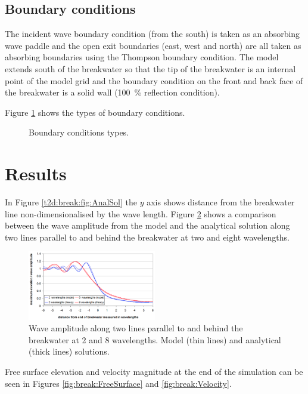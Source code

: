 \subsection{Boundary conditions}
The incident wave boundary condition (from the south) is taken as an absorbing
wave paddle and the open exit boundaries (east, west and north) are all taken
as absorbing boundaries using the Thompson boundary condition.
The model extends south of the breakwater so that the tip of the breakwater is
an internal point of the model grid and the boundary condition on the front and
back face of the breakwater is a solid wall (100~\% reflection condition).

Figure \ref{t2d:break:fig:BC} shows the types of boundary conditions.
\begin{figure}[!htbp]
 \centering
 \caption{Boundary conditions types.}
 \label{t2d:break:fig:BC}
\end{figure}

\section{Results}
In Figure \ref{t2d:break:fig:AnalSol} the $y$ axis shows distance from the
breakwater line non-dimensionalised by the wave length.
Figure \ref{t2d:break:fig:WaveAmplitude} shows a comparison between the wave
amplitude from the model and the analytical solution along two lines parallel to
and behind the breakwater at two and eight wavelengths.

\begin{figure}[!htbp]
 \centering
 \includegraphics[width=0.5\textwidth]{img/WaveAmplitude.png}
 \caption{Wave amplitude along two lines parallel to and behind the breakwater at 2 and 8 wavelengths. Model (thin lines) and analytical (thick lines) solutions.}
 \label{t2d:break:fig:WaveAmplitude}
\end{figure}


Free surface elevation and velocity magnitude at the end of the simulation
can be seen in Figures \ref{fig:break:FreeSurface} and
\ref{fig:break:Velocity}.

